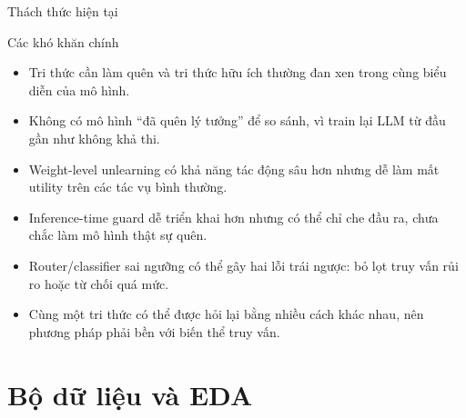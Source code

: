\documentclass[t, aspectratio=169]{beamer}
\begin{document}
\begin{frame}{Thách thức hiện tại}
  \small
  \begin{block}{Các khó khăn chính}
    \begin{itemize}
      \item Tri thức cần làm quên và tri thức hữu ích thường đan xen trong cùng biểu diễn của mô hình.
      \item Không có mô hình ``đã quên lý tưởng'' để so sánh, vì train lại LLM từ đầu gần như không khả thi.
      \item Weight-level unlearning có khả năng tác động sâu hơn nhưng dễ làm mất utility trên các tác vụ bình thường.
      \item Inference-time guard dễ triển khai hơn nhưng có thể chỉ che đầu ra, chưa chắc làm mô hình thật sự quên.
      \item Router/classifier sai ngưỡng có thể gây hai lỗi trái ngược: bỏ lọt truy vấn rủi ro hoặc từ chối quá mức.
      \item Cùng một tri thức có thể được hỏi lại bằng nhiều cách khác nhau, nên phương pháp phải bền với biến thể truy vấn.
    \end{itemize}
  \end{block}
\end{frame}

\section{Bộ dữ liệu và EDA}
\end{document}
